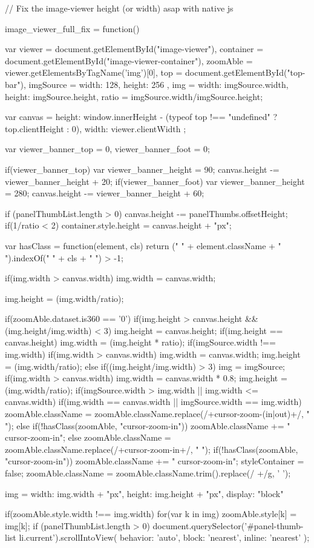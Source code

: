 // Fix the image-viewer height (or width) asap with native js

image_viewer_full_fix = function() {

	var viewer = document.getElementById("image-viewer"),
		container = document.getElementById("image-viewer-container"),
		zoomAble = viewer.getElementsByTagName('img')[0],
		top = document.getElementById("top-bar"),
		imgSource = {
			width: 128,
			height: 256		},
		img = {width: imgSource.width, height: imgSource.height},
		ratio = imgSource.width/imgSource.height;
	
	var canvas = {
			height: window.innerHeight - (typeof top !== "undefined" ? top.clientHeight : 0),
			width: viewer.clientWidth
		};
	
	var viewer_banner_top = 0,
		viewer_banner_foot = 0;
	
	if(viewer_banner_top) {
		var viewer_banner_height = 90;
		canvas.height -= viewer_banner_height + 20;
	}
	if(viewer_banner_foot) {
		var viewer_banner_height = 280;
		canvas.height -= viewer_banner_height + 60;
	}
	
	if (panelThumbList.length > 0) {
		canvas.height -= panelThumbs.offsetHeight;
	}
	if(1/ratio < 2) {
		container.style.height = canvas.height + "px";
	}
	
	var hasClass = function(element, cls) {
		return (" " + element.className + " ").indexOf(" " + cls + " ") > -1;
	}

	if(img.width > canvas.width) {
		img.width = canvas.width;
	}

	img.height = (img.width/ratio);
	
	if(zoomAble.dataset.is360 == '0') {
		if(img.height > canvas.height && (img.height/img.width) < 3) {
			img.height = canvas.height;
		}
		if(img.height == canvas.height) {
			img.width = (img.height * ratio);
		}
		if(imgSource.width !== img.width) {
			if(img.width > canvas.width) {
				img.width = canvas.width;
				img.height = (img.width/ratio);
			} else if((img.height/img.width) > 3) {
				img = imgSource;
				if(img.width > canvas.width) {
					img.width = canvas.width * 0.8;
				}
				img.height = (img.width/ratio);
			}
		}
		if(imgSource.width > img.width || img.width <= canvas.width) {
			if(img.width == canvas.width || imgSource.width == img.width) {
				zoomAble.className = zoomAble.className.replace(/\s+cursor-zoom-(in|out)\s+/, " ");
			} else {
				if(!hasClass(zoomAble, "cursor-zoom-in")) {
					zoomAble.className += " cursor-zoom-in";
				} else {
					zoomAble.className = zoomAble.className.replace(/\s+cursor-zoom-in\s+/, " ");
					if(!hasClass(zoomAble, "cursor-zoom-in")) {
						zoomAble.className += " cursor-zoom-in";
						styleContainer = false;
					}
				}
			}
			zoomAble.className = zoomAble.className.trim().replace(/ +/g, ' ');
		}
	}
	
	img = {
		width: img.width + "px",
		height: img.height + "px",
		display: "block"
	}
	
	if(zoomAble.style.width !== img.width) {
		for(var k in img) {
			zoomAble.style[k] = img[k];
		}
	}
	if (panelThumbList.length > 0) {
		document.querySelector('#panel-thumb-list li.current').scrollIntoView({
			behavior: 'auto',
			block: 'nearest',
			inline: 'nearest'
		});
	}
}

